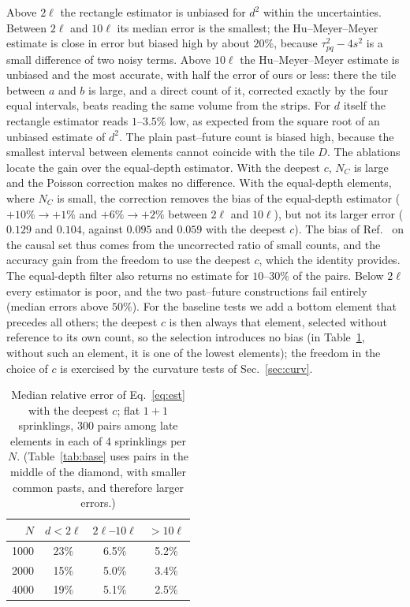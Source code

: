 \documentclass[prd,twocolumn,superscriptaddress,nofootinbib,amsmath,amssymb,floatfix]{revtex4-2}
\begin{document}
Above $2\ell$ the rectangle estimator is unbiased for $d^2$ within the uncertainties. Between $2\ell$ and $10\ell$ its median error is the smallest; the Hu--Meyer--Meyer estimate is close in error but biased high by about $20\%$, because $\tau_{pq}^2-4s^2$ is a small difference of two noisy terms. Above $10\ell$ the Hu--Meyer--Meyer estimate is unbiased and the most accurate, with half the error of ours or less: there the tile between $a$ and $b$ is large, and a direct count of it, corrected exactly by the four equal intervals, beats reading the same volume from the strips. For $d$ itself the rectangle estimator reads $1$--$3.5\%$ low, as expected from the square root of an unbiased estimate of $d^2$. The plain past--future count is biased high, because the smallest interval between elements cannot coincide with the tile $D$. The ablations locate the gain over the equal-depth estimator. With the deepest $c$, $N_C$ is large and the Poisson correction makes no difference. With the equal-depth elements, where $N_C$ is small, the correction removes the bias of the equal-depth estimator ($+10\%\to+1\%$ and $+6\%\to+2\%$ between $2\ell$ and $10\ell$), but not its larger error ($0.129$ and $0.104$, against $0.095$ and $0.059$ with the deepest $c$). The bias of Ref.~\cite{BK24} on the causal set thus comes from the uncorrected ratio of small counts, and the accuracy gain from the freedom to use the deepest $c$, which the identity provides. The equal-depth filter also returns no estimate for $10$--$30\%$ of the pairs. Below $2\ell$ every estimator is poor, and the two past--future constructions fail entirely (median errors above $50\%$). For the baseline tests we add a bottom element that precedes all others; the deepest $c$ is then always that element, selected without reference to its own count, so the selection introduces no bias (in Table~\ref{tab:dist}, without such an element, it is one of the lowest elements); the freedom in the choice of $c$ is exercised by the curvature tests of Sec.~\ref{sec:curv}.

\begin{table}[t]
\caption{Median relative error of Eq.~\eqref{eq:est} with the deepest $c$; flat $1+1$ sprinklings, 300 pairs among late elements in each of 4 sprinklings per $N$. (Table~\ref{tab:base} uses pairs in the middle of the diamond, with smaller common pasts, and therefore larger errors.)}
\label{tab:dist}
\begin{ruledtabular}
\begin{tabular}{rccc}
$N$ & $d<2\ell$ & $2\ell$--$10\ell$ & $>10\ell$\\
\hline
1000 & 23\% & 6.5\% & 5.2\%\\
2000 & 15\% & 5.0\% & 3.4\%\\
4000 & 19\% & 5.1\% & 2.5\%\\
\end{tabular}
\end{ruledtabular}
\end{table}
\end{document}
